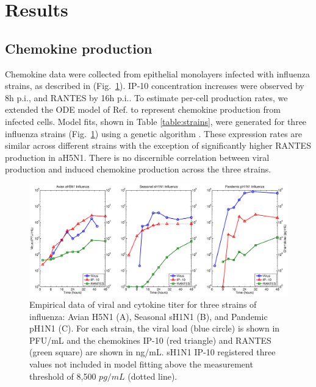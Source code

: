 \documentclass[10pt]{article}
\begin{document}
\section*{Results}

\subsection*{Chemokine production}

Chemokine data were collected from epithelial monolayers infected with influenza strains, as described in \cite{Mitchell2011} (Fig.~\ref{fig:data}).  IP-10 concentration increases were observed by 8h p.i., and RANTES by 16h p.i..  To estimate per-cell production rates, we extended the ODE model of Ref. \cite{Mitchell2011} to represent chemokine production from infected cells.  Model fits, shown in Table \ref{table:strains}, were generated for three influenza strains (Fig.~\ref{fig:data}) using a genetic algorithm \cite{Mitchell2011}.  These expression rates are similar across different strains with the exception of significantly higher RANTES production in aH5N1.  There is no discernible correlation between viral production and induced chemokine production across the three strains.

\begin{figure}[ht!]
\begin{center}
 \includegraphics[width=\textwidth]{data}
 \end{center}
\caption{Empirical data of viral and cytokine titer for three strains of influenza: Avian H5N1 (A), Seasonal sH1N1 (B), and Pandemic pH1N1 (C).  For each strain, the viral load (blue circle) is shown in PFU/mL and the chemokines IP-10 (red triangle) and RANTES (green square) are shown in ng/mL.  sH1N1 IP-10 registered three values not included in model fitting above the measurement threshold of 8,500 $pg/mL$ (dotted line).} 
 \label{fig:data}
\end{figure}
\end{document}
